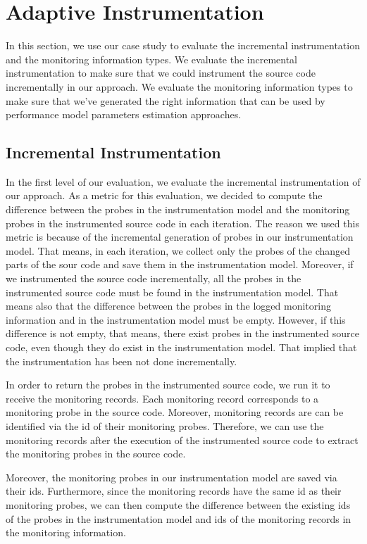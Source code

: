 \section{Adaptive Instrumentation}
\label{sec:Adaptive Instrumentation}
In this section, we use our case study to evaluate the incremental instrumentation and the monitoring information types. We evaluate the incremental instrumentation to make sure that we could instrument the source code incrementally in our approach. We evaluate the monitoring information types to make sure that we've generated the right information that can be used by performance model parameters estimation approaches. 

\subsection{Incremental Instrumentation}
\label{sec:Incremental Instrumentation}
In the first level of our evaluation, we evaluate the incremental instrumentation of our approach. As a metric for this evaluation, we decided to compute the difference between the probes in the instrumentation model and the monitoring probes in the instrumented source code in each iteration. The reason we used this metric is because of the incremental generation of probes in our instrumentation model. That means, in each iteration, we collect only the probes of the changed parts of the sour code and save them in the instrumentation model. Moreover, if we instrumented the source code incrementally, all the probes in the instrumented source code must be found in the instrumentation model. That means also that the difference between the probes in the logged monitoring information and in the instrumentation model must be empty. However, if this difference is not empty, that means, there exist probes in the instrumented source code, even though they do exist in the instrumentation model. That implied that the instrumentation has been not done incrementally.

In order to return the probes in the instrumented source code, we run it to receive the monitoring records. Each monitoring record corresponds to a monitoring probe in the source code. Moreover, monitoring records are can be identified via the id of their monitoring probes. Therefore, we can use the monitoring records after the execution of the instrumented source code to extract the monitoring probes in the source code. 

Moreover, the monitoring probes in our instrumentation model are saved via their ids. Furthermore, since the monitoring records have the same id as their monitoring probes, we can then compute the difference between the existing ids of the probes in the instrumentation model and ids of the monitoring records in the monitoring information. 

